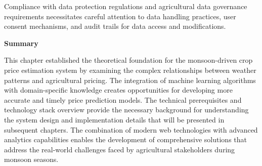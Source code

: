 Compliance with data protection regulations and agricultural data governance requirements necessitates careful attention to data handling practices, user consent mechanisms, and audit trails for data access and modifications.

\vspace{0.5cm}

\noindent\textbf{Summary}

This chapter established the theoretical foundation for the monsoon-driven crop price estimation system by examining the complex relationships between weather patterns and agricultural pricing. The integration of machine learning algorithms with domain-specific knowledge creates opportunities for developing more accurate and timely price prediction models. The technical prerequisites and technology stack overview provide the necessary background for understanding the system design and implementation details that will be presented in subsequent chapters. The combination of modern web technologies with advanced analytics capabilities enables the development of comprehensive solutions that address the real-world challenges faced by agricultural stakeholders during monsoon seasons.